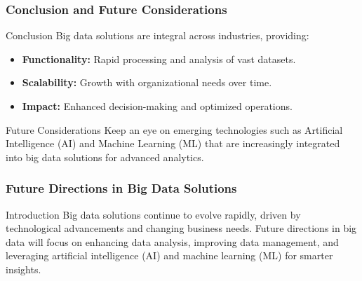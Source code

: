 \documentclass[aspectratio=169]{beamer}
\begin{document}
\begin{frame}[fragile]
    \frametitle{Conclusion and Future Considerations}
    \begin{block}{Conclusion}
        Big data solutions are integral across industries, providing:
        \begin{itemize}
            \item \textbf{Functionality:} Rapid processing and analysis of vast datasets.
            \item \textbf{Scalability:} Growth with organizational needs over time.
            \item \textbf{Impact:} Enhanced decision-making and optimized operations.
        \end{itemize}
    \end{block}

    \begin{block}{Future Considerations}
        Keep an eye on emerging technologies such as Artificial Intelligence (AI) and Machine Learning (ML) that are increasingly integrated into big data solutions for advanced analytics.
    \end{block}
\end{frame}

\begin{frame}[fragile]
    \frametitle{Future Directions in Big Data Solutions}
    \begin{block}{Introduction}
        Big data solutions continue to evolve rapidly, driven by technological advancements and changing business needs. Future directions in big data will focus on enhancing data analysis, improving data management, and leveraging artificial intelligence (AI) and machine learning (ML) for smarter insights.
    \end{block}
\end{frame}
\end{document}
